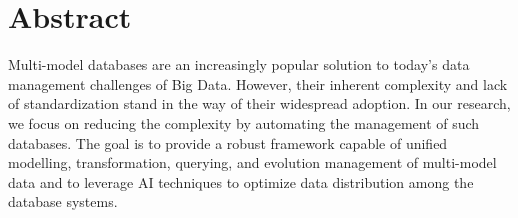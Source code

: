 



% 



\section*{Abstract}

Multi-model databases are an increasingly popular solution to today's data management challenges of Big Data. However, their inherent complexity and lack of standardization stand in the way of their widespread adoption. In our research, we focus on reducing the complexity by automating the management of such databases. The goal is to provide a robust framework capable of unified modelling, transformation, querying, and evolution management of multi-model data and to leverage AI techniques to optimize data distribution among the database systems.


